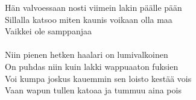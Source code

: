             Hän valvoessaan nosti viimein lakin päälle pään \\
            Sillalla katsoo miten kaunis voikaan olla maa \\
            Vaikkei ole samppanjaa \\
\hspace{10mm} \\
            Niin pienen hetken haalari on lumivalkoinen \\
            On puhdas niin kuin lakki wappuaaton fuksien \\
            Voi kumpa joskus kauemmin sen loisto kestää vois \\
            Vaan wapun tullen katoaa ja tummuu aina pois \\
